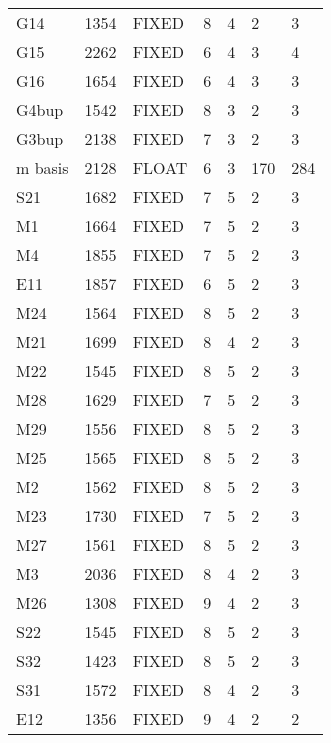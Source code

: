 \begin{table}[!ht]
\begin{tabular}{lllllll}
G14     & 1354 & FIXED & 8              & 4                  & 2    & 3    \\
G15     & 2262 & FIXED & 6              & 4                  & 3    & 4    \\
G16     & 1654 & FIXED & 6              & 4                  & 3    & 3    \\
G4bup   & 1542 & FIXED & 8              & 3                  & 2    & 3    \\
G3bup   & 2138 & FIXED & 7              & 3                  & 2    & 3    \\
m basis & 2128 & FLOAT & 6              & 3                  & 170  & 284  \\
S21     & 1682 & FIXED & 7              & 5                  & 2    & 3    \\
M1      & 1664 & FIXED & 7              & 5                  & 2    & 3    \\
M4      & 1855 & FIXED & 7              & 5                  & 2    & 3    \\
E11     & 1857 & FIXED & 6              & 5                  & 2    & 3    \\
M24     & 1564 & FIXED & 8              & 5                  & 2    & 3    \\
M21     & 1699 & FIXED & 8              & 4                  & 2    & 3    \\
M22     & 1545 & FIXED & 8              & 5                  & 2    & 3    \\
M28     & 1629 & FIXED & 7              & 5                  & 2    & 3    \\
M29     & 1556 & FIXED & 8              & 5                  & 2    & 3    \\
M25     & 1565 & FIXED & 8              & 5                  & 2    & 3    \\
M2      & 1562 & FIXED & 8              & 5                  & 2    & 3    \\
M23     & 1730 & FIXED & 7              & 5                  & 2    & 3    \\
M27     & 1561 & FIXED & 8              & 5                  & 2    & 3    \\
M3      & 2036 & FIXED & 8              & 4                  & 2    & 3    \\
M26     & 1308 & FIXED & 9              & 4                  & 2    & 3    \\
S22     & 1545 & FIXED & 8              & 5                  & 2    & 3    \\
S32     & 1423 & FIXED & 8              & 5                  & 2    & 3    \\
S31     & 1572 & FIXED & 8              & 4                  & 2    & 3    \\
E12     & 1356 & FIXED & 9              & 4                  & 2    & 2   \\
\bottomrule
\end{tabular}
\end{table}

